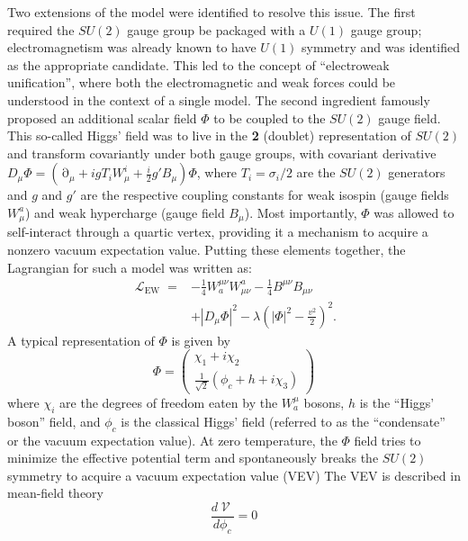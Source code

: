 \documentclass[%
 reprint,
nofootinbib,
 amsmath,amssymb,
 aps,
floatfix,
]{revtex4-1}
\DeclareMathOperator{\Lagr}{\mathcal{L}}
\DeclareMathOperator{\del}{\partial}
\DeclareMathOperator{\V}{\mathcal{V}}
\begin{document}
Two extensions of the model were identified to resolve this issue.
The first required the $SU(2)$ gauge group be packaged with a $U(1)$ gauge group; electromagnetism was already known to have $U(1)$ symmetry and was identified as the appropriate candidate.
This led to the concept of ``electroweak unification'', where both the electromagnetic and weak forces could be understood in the context of a single model.
The second ingredient famously proposed an additional scalar field $\Phi$ to be coupled to the $SU(2)$ gauge field.
This so-called Higgs' field was to live in the \textbf{2} (doublet) representation of $SU(2)$ and transform covariantly under both gauge groups, with covariant derivative $D_\mu \Phi = \left(\del_\mu + igT_iW^i_\mu + \frac{i}{2}g'B_\mu\right)\Phi$, where $T_i=\sigma_i/2$ are the $SU(2)$ generators and $g$ and $g'$ are the respective coupling constants for weak isospin (gauge fields $W^a_\mu$) and weak hypercharge (gauge field $B_\mu$).
Most importantly, $\Phi$ was allowed to self-interact through a quartic vertex, providing it a mechanism to acquire a nonzero vacuum expectation value.
Putting these elements together, the Lagrangian for such a model was written as:
\begin{equation}
\begin{split}
    \Lagr_\text{EW}= &-\frac{1}{4}W^{\mu\nu}_a W^a_{\mu\nu} - \frac{1}{4}B^{\mu\nu}B_{\mu\nu} \\ &+ \left|D_\mu \Phi\right|^2-\lambda\left(|\Phi|^2-\frac{v^2}{2}\right)^2.
\end{split}
\label{eq:smlagr}
\end{equation}
A typical representation of $\Phi$ is given by \cite{quiros99}
\begin{equation}
    \Phi = \begin{pmatrix} \chi_1 + i\chi_2 \\ \frac{1}{\sqrt{2}}\left(\phi_c + h + i\chi_3\right)\end{pmatrix}
\end{equation}
where $\chi_i$ are the degrees of freedom eaten by the $W_a^\mu$ bosons, $h$ is the ``Higgs' boson'' field, and $\phi_c$ is the classical Higgs' field (referred to as the ``condensate'' or the vacuum expectation value).
At zero temperature, the $\Phi$ field tries to minimize the effective potential term and spontaneously breaks the $SU(2)$ symmetry to acquire a vacuum expectation value (VEV)
The VEV is described in mean-field theory \cite{dj74}
\begin{equation}
    \frac{d\V}{d\phi_c} = 0
\end{equation}
\end{document}
